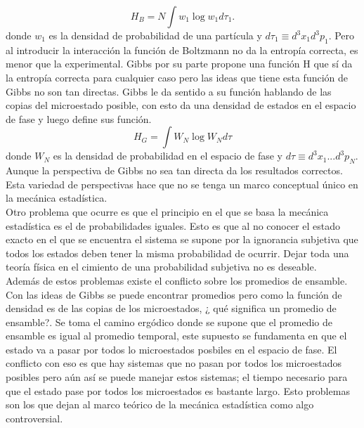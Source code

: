 \begin{equation}
H_{B}=N \int w_{1} \log w_{1} d \tau_{1}.
\end{equation}
donde $w_{1}$ es la densidad de probabilidad de una partícula y $d \tau_{1} \equiv d^{3}x_{1}d^{3}p_{1}$.
Pero al introducir la interacción la función de Boltzmann no da la entropía correcta, es menor que la experimental. Gibbs por su parte propone una función H que sí da la entropía correcta para cualquier caso pero las ideas que tiene esta función de Gibbs no son tan directas. Gibbs le da sentido a su función hablando de las copias del microestado posible, con esto da una densidad de estados en el espacio de fase y luego define sus función.
\begin{equation}
H_{G}= \int W_{N}  \log W_{N} d \tau
\end{equation}
donde $W_{N}$ es la densidad de probabilidad en el espacio de fase y $d\tau \equiv d^{3}x_{1}...d^{3}p_{N}$. Aunque la perspectiva de Gibbs no sea tan directa da los resultados correctos. Esta variedad de perspectivas hace que no se tenga un marco conceptual único en la mecánica estadística.
\\
Otro problema que ocurre es que el principio en el que se basa la mecánica estadística es el de probabilidades iguales. Esto es que al no conocer el estado exacto en el que se encuentra el sistema se supone por la ignorancia subjetiva que todos los estados deben tener la misma probabilidad de ocurrir. Dejar toda una teoría física en el cimiento de una probabilidad subjetiva no es deseable.
\\
Además de estos problemas existe el conflicto sobre los promedios de ensamble. Con las ideas de Gibbs se puede encontrar promedios pero como la función de densidad es de las copias de los microestados, ¿ qué significa un promedio de ensamble?. Se toma el camino ergódico donde se supone que el promedio de ensamble es igual al promedio temporal, este supuesto se fundamenta en que el estado va a pasar por todos lo microestados posbiles en el espacio de fase. El conflicto con eso es que hay sistemas que no pasan por todos los microestados posibles pero aún así se puede manejar estos sistemas; el tiempo necesario para que el estado pase por todos los microestados es bastante largo. Esto problemas son los que dejan al marco teórico de la mecánica estadística como algo controversial. 




